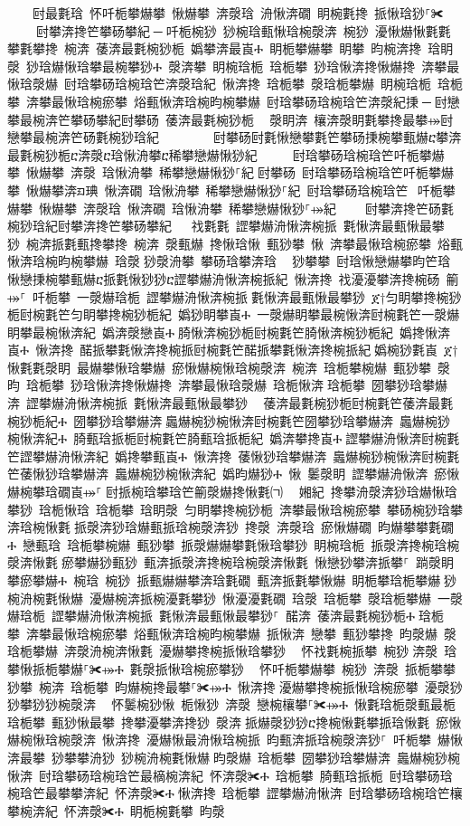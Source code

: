 ﻿\documentclass[output=paper]{langsci/langscibook}
\begin{document}
\begin{exe}
{\begin{exe}
    尀最氀琀 怀吀栀攀爀攀 愀爀攀 渀漀琀 洀愀渀礀 眀椀氀搀 挀愀琀猀⸀✀ ਀    尀攀渀搀笀攀砀攀紀਀─਀吀栀椀猀 猀椀琀甀愀琀椀漀渀 椀猀 瀀愀爀愀氀氀攀氀攀搀 椀渀 䔀渀最氀椀猀栀 嬀攀渀最崀Ⰰ 眀栀攀爀攀 眀攀 昀椀渀搀 琀眀漀 猀琀爀愀琀攀最椀攀猀Ⰰ 漀渀攀 眀椀琀栀 琀栀攀 猀琀愀渀搀愀爀搀 渀攀最愀琀漀爀 尀琀攀砀琀椀琀笀渀漀琀紀 愀渀搀 琀栀攀 漀琀栀攀爀 眀椀琀栀 琀栀攀 渀攀最愀琀椀瘀攀 焀甀愀渀琀椀昀椀攀爀 尀琀攀砀琀椀琀笀渀漀紀㨀਀─਀尀戀攀最椀渀笀攀砀攀紀尀攀砀 䔀渀最氀椀猀栀 ⠀漀眀渀 欀渀漀眀氀攀搀最攀⤀尀戀攀最椀渀笀砀氀椀猀琀紀਀        尀攀砀尀氀愀戀攀氀笀攀砀㨀椀攀甀爀ⴀ攀渀最氀椀猀栀ⴀ渀漀ⴀ琀愀洀攀ⴀ稀攀戀爀愀猀紀਀     尀琀攀砀琀椀琀笀吀栀攀爀攀 愀爀攀 渀漀 琀愀洀攀 稀攀戀爀愀猀⸀紀਀尀攀砀 尀琀攀砀琀椀琀笀吀栀攀爀攀 愀爀攀渀ᤀ琠 愀渀礀 琀愀洀攀 稀攀戀爀愀猀⸀紀 尀琀攀砀琀椀琀笀⠀吀栀攀爀攀 愀爀攀 渀漀琀 愀渀礀 琀愀洀攀 稀攀戀爀愀猀⸀⤀紀਀    尀攀渀搀笀砀氀椀猀琀紀尀攀渀搀笀攀砀攀紀਀਀  䄀氀氀 䜀攀爀洀愀渀椀挀 氀愀渀最甀愀最攀猀 椀渀挀氀甀搀攀搀 椀渀 漀甀爀 搀愀琀愀 甀猀攀 愀 渀攀最愀琀椀瘀攀 焀甀愀渀琀椀昀椀攀爀 琀漀਀猀漀洀攀 攀砀琀攀渀琀 ⠀猀攀攀 尀琀愀戀爀攀昀笀琀愀戀㨀椀攀甀爀ⴀ挀氀愀猀猀ⴀ䜀攀爀洀愀渀椀挀紀 愀渀搀 䄀瀀瀀攀渀搀椀砀 䈀⤀⸀ 吀栀攀 一漀爀琀栀 䜀攀爀洀愀渀椀挀਀氀愀渀最甀愀最攀猀 ጀ†匀眀攀搀椀猀栀尀椀氀笀匀眀攀搀椀猀栀紀 嬀猀眀攀崀Ⰰ 一漀爀眀攀最椀愀渀尀椀氀笀一漀爀眀攀最椀愀渀紀 嬀渀漀戀崀Ⰰ਀䐀愀渀椀猀栀尀椀氀笀䐀愀渀椀猀栀紀 嬀搀愀渀崀Ⰰ 愀渀搀 䤀挀攀氀愀渀搀椀挀尀椀氀笀䤀挀攀氀愀渀搀椀挀紀਀嬀椀猀氀崀 ጀ†愀氀氀漀眀 最爀攀愀琀攀爀 瘀愀爀椀愀琀椀漀渀 椀渀 琀栀攀椀爀 甀猀攀 漀昀 琀栀攀 猀琀愀渀搀愀爀搀 渀攀最愀琀漀爀 琀栀愀渀਀琀栀攀 圀攀猀琀攀爀渀 䜀攀爀洀愀渀椀挀 氀愀渀最甀愀最攀猀 ⠀䔀渀最氀椀猀栀尀椀氀笀䔀渀最氀椀猀栀紀Ⰰ 圀攀猀琀攀爀渀਀䘀爀椀猀椀愀渀尀椀氀笀圀攀猀琀攀爀渀 䘀爀椀猀椀愀渀紀Ⰰ 䐀甀琀挀栀尀椀氀笀䐀甀琀挀栀紀 嬀渀攀搀崀Ⰰ਀䜀攀爀洀愀渀尀椀氀笀䜀攀爀洀愀渀紀 嬀搀攀甀崀Ⰰ 愀渀搀 䔀愀猀琀攀爀渀 䘀爀椀猀椀愀渀尀椀氀笀䔀愀猀琀攀爀渀 䘀爀椀猀椀愀渀紀 嬀昀爀猀Ⰰ 愀 䰀漀眀 䜀攀爀洀愀渀 瘀愀爀椀攀琀礀崀⤀⸀਀尀挀椀琀攀琀笀䈀漀爀搀愀氀㈀　㄀㜀紀 搀攀洀漀渀猀琀爀愀琀攀猀 琀栀愀琀 琀栀攀 琀眀漀 匀眀攀搀椀猀栀 渀攀最愀琀椀瘀攀 攀砀椀猀琀攀渀琀椀愀氀਀挀漀渀猀琀爀甀挀琀椀漀渀猀 搀漀 渀漀琀 瘀愀爀礀 昀爀攀攀氀礀Ⰰ 戀甀琀 琀栀攀椀爀 甀猀攀 挀漀爀爀攀氀愀琀攀猀 眀椀琀栀 挀漀渀搀椀琀椀漀渀愀氀਀瘀攀爀猀甀猀 甀渀挀漀渀搀椀琀椀漀渀愀氀 愀戀猀攀渀挀攀⸀ 䠀漀眀攀瘀攀爀Ⰰ 椀琀 椀猀 挀甀爀爀攀渀琀氀礀 甀渀挀氀攀愀爀 眀栀攀琀栀攀爀਀猀椀洀椀氀愀爀 瀀爀椀渀挀椀瀀氀攀猀 愀瀀瀀氀礀 琀漀 琀栀攀 漀琀栀攀爀 一漀爀琀栀 䜀攀爀洀愀渀椀挀 氀愀渀最甀愀最攀猀⸀ 䤀渀 䔀渀最氀椀猀栀Ⰰ਀琀栀攀 渀攀最愀琀椀瘀攀 焀甀愀渀琀椀昀椀攀爀 挀愀渀 戀攀 甀猀攀搀 昀漀爀 漀琀栀攀爀 渀漀洀椀渀愀氀 瀀爀攀搀椀挀愀琀攀猀 ⠀怀䄀氀椀挀攀 椀猀਀渀漀 琀攀愀挀栀攀爀⸀✀⤀Ⰰ 氀漀挀愀琀椀瘀攀猀 ⠀怀吀栀攀爀攀 椀猀 渀漀 挀栀攀攀猀攀 椀渀 琀栀攀 昀爀椀搀最攀⸀✀⤀Ⰰ 愀渀搀਀瀀爀攀搀椀挀愀琀椀瘀攀 瀀漀猀猀攀猀猀椀漀渀 ⠀怀䰀椀猀愀 栀愀猀 渀漀 戀椀欀攀⸀✀⤀Ⰰ 愀氀琀栀漀甀最栀 琀栀攀 甀猀愀最攀 搀攀瀀攀渀搀猀 漀渀਀挀爀漀猀猀ⴀ搀椀愀氀攀挀琀愀氀 瘀愀爀椀愀琀椀漀渀 愀渀搀 瀀爀愀最洀愀琀椀挀 昀甀渀挀琀椀漀渀猀⸀ 吀栀攀 爀愀渀最攀 猀攀攀洀猀 猀椀洀椀氀愀爀਀昀漀爀 琀栀攀 圀攀猀琀攀爀渀 䘀爀椀猀椀愀渀 尀琀攀砀琀椀琀笀最樀椀渀紀 怀渀漀✀Ⰰ 琀栀攀 䐀甀琀挀栀 尀琀攀砀琀椀琀笀最攀攀渀紀 怀渀漀✀Ⰰ਀愀渀搀 琀栀攀 䜀攀爀洀愀渀 尀琀攀砀琀椀琀笀欀攀椀渀紀 怀渀漀✀Ⰰ 眀栀椀氀攀 昀漀
\end{exe}}
\end{exe}
\end{document}
